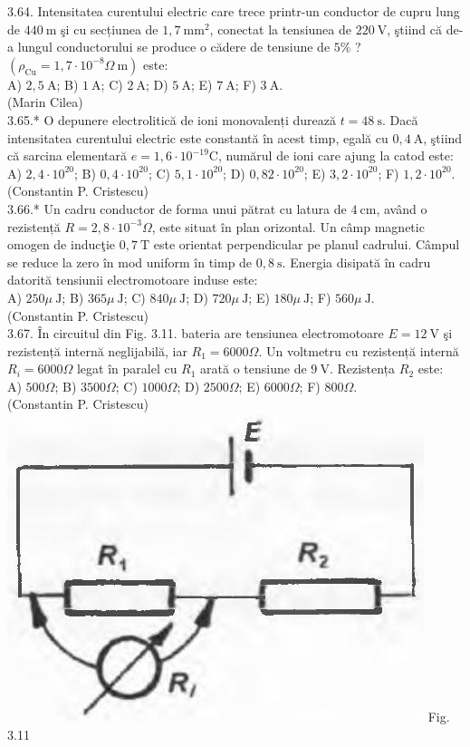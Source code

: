 3.64. Intensitatea curentului electric care trece printr-un conductor de cupru lung de $440 \mathrm{~m}$ şi cu secțiunea de $1,7 \mathrm{~mm}^{2}$, conectat la tensiunea de $220 \mathrm{~V}$, ştiind că de-a lungul conductorului se produce o cădere de tensiune de $5 \%$ ? $\left(\rho_{\mathrm{Cu}}=1,7 \cdot 10^{-8} \Omega \mathrm{~m}\right)$ este:\\ A) $2,5 \mathrm{~A}$; B) $1 \mathrm{~A}$; C) $2 \mathrm{~A}$; D) $5 \mathrm{~A}$; E) $7 \mathrm{~A}$; F) $3 \mathrm{~A}$.\\ (Marin Cilea)\\

3.65.* O depunere electrolitică de ioni monovalenți durează $t=48 \mathrm{~s}$. Dacă intensitatea curentului electric este constantă în acest timp, egală cu $0,4 \mathrm{~A}$, ştiind că sarcina elementară $e=1,6 \cdot 10^{-19} \mathrm{C}$, numărul de ioni care ajung la catod este:\\ A) $2,4 \cdot 10^{20}$; B) $0,4 \cdot 10^{20}$; C) $5,1 \cdot 10^{20}$; D) $0,82 \cdot 10^{20}$; E) $3,2 \cdot 10^{20}$; F) $1,2 \cdot 10^{20}$.\\ (Constantin P. Cristescu)\\

3.66.* Un cadru conductor de forma unui pătrat cu latura de $4 \mathrm{~cm}$, având o rezistență $R=2,8 \cdot 10^{-3} \Omega$, este situat în plan orizontal. Un câmp magnetic omogen de inducţie $0,7 \mathrm{~T}$ este orientat perpendicular pe planul cadrului. Câmpul se reduce la zero în mod uniform în timp de $0,8 \mathrm{~s}$. Energia disipată în cadru datorită tensiunii electromotoare induse este:\\ A) $250 \mu \mathrm{~J}$; B) $365 \mu \mathrm{~J}$; C) $840 \mu \mathrm{~J}$; D) $720 \mu \mathrm{~J}$; E) $180 \mu \mathrm{~J}$; F) $560 \mu \mathrm{~J}$.\\ (Constantin P. Cristescu)\\

3.67. În circuitul din Fig. 3.11. bateria are tensiunea electromotoare $E=12 \mathrm{~V}$ şi rezistență internă neglijabilă, iar $R_{1}=6000 \Omega$. Un voltmetru cu rezistență internă $R_{i}=6000 \Omega$ legat în paralel cu $R_{1}$ arată o tensiune de $9 \mathrm{~V}$. Rezistența $R_{2}$ este:\\ A) $500 \Omega$; B) $3500 \Omega$; C) $1000 \Omega$; D) $2500 \Omega$; E) $6000 \Omega$; F) $800 \Omega$.\\ (Constantin P. Cristescu)\\ \includegraphics[width=0.4\linewidth]{images/2025_07_01_5b3ff9fa0d508c8e9f17g-158} Fig. 3.11\\

